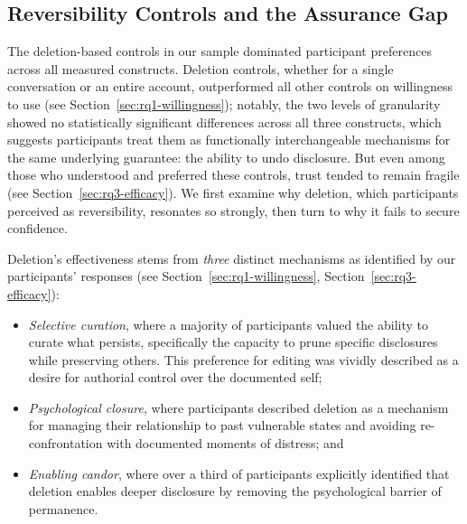 \documentclass[letterpaper,twocolumn,10pt]{article}
\begin{document}
\subsection{Reversibility Controls and the Assurance Gap}
\label{sec:assurance-gap}

The deletion-based controls in our sample dominated participant preferences across all measured constructs. Deletion controls, whether for a single conversation or an entire account, outperformed all other controls on willingness to use (see Section~\ref{sec:rq1-willingness}); notably, the two levels of granularity showed no statistically significant differences across all three constructs, which suggests participants treat them as functionally interchangeable mechanisms for the same underlying guarantee: the ability to undo disclosure. But even among those who understood and preferred these controls, trust tended to remain fragile (see Section~\ref{sec:rq3-efficacy}). We first examine why deletion, which participants perceived as reversibility, resonates so strongly, then turn to why it fails to secure confidence.

 Deletion's effectiveness stems from \textit{three} distinct mechanisms as identified by our participants' responses (see Section~\ref{sec:rq1-willingness}, Section~\ref{sec:rq3-efficacy}): 
\begin{itemize}
    \item \textit{Selective curation}, where a majority of participants valued the ability to curate what persists, specifically the capacity to prune specific disclosures while preserving others. This preference for editing was vividly described as a desire for authorial control over the documented self;
    \item \textit{Psychological closure}, where participants described deletion as a mechanism for managing their relationship to past vulnerable states and avoiding re-confrontation with documented moments of distress; and
    \item \textit{Enabling candor}, where over a third of participants explicitly identified that deletion enables deeper disclosure by removing the psychological barrier of permanence.
\end{itemize} 
\end{document}
